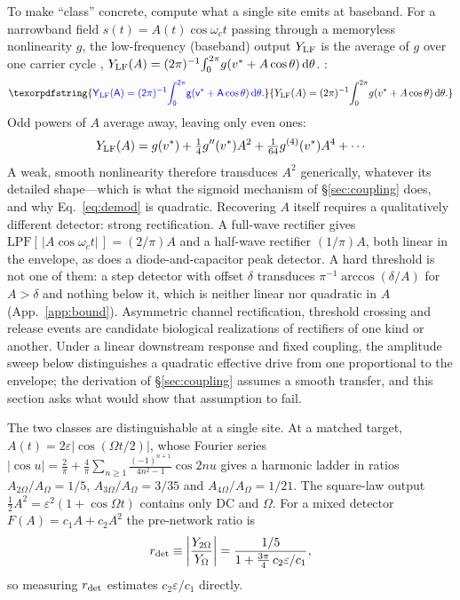 \documentclass[11pt,a4paper]{article}
\newcommand{\half}{\tfrac{1}{2}}
\providecommand{\DIFaddtex}[1]{{\protect\color{blue} \sf #1}} %
\providecommand{\DIFdeltex}[1]{{\protect\color{red} \scriptsize #1}} %
\providecommand{\DIFaddbegin}{} %
\providecommand{\DIFaddend}{} %
\providecommand{\DIFdelbegin}{} %
\providecommand{\DIFdelend}{} %
\providecommand{\DIFadd}[1]{\texorpdfstring{\DIFaddtex{#1}}{#1}} %
\providecommand{\DIFdel}[1]{\texorpdfstring{\DIFdeltex{#1}}{}} %
\begin{document}
\DIFdelbegin \DIFdel{To make ``class'' concrete, compute what a single site emits at baseband. }\DIFdelend For a narrowband field $s(t)=A(t)\cos\omega_c t$ passing through a memoryless nonlinearity
$g$, the low-frequency (baseband) output $Y_{\rm LF}$ is the average of $g$ over one
carrier cycle\DIFdelbegin \DIFdel{,
$Y_{\rm LF}(A)=(2\pi)^{-1}\!\int_0^{2\pi}\!g(v^*+A\cos\theta)\,\mathrm{d}\theta$. }\DIFdelend \DIFaddbegin \DIFadd{:
}\[
\DIFadd{Y_{\rm LF}(A)=(2\pi)^{-1}\!\int_0^{2\pi}\!g(v^*+A\cos\theta)\,\mathrm{d}\theta.
}\]
\DIFaddend Odd powers of $A$ average away, leaving only even ones:
\begin{equation}
Y_{\rm LF}(A)=g(v^*)+\tfrac14 g''(v^*)A^2+\tfrac1{64}g^{(4)}(v^*)A^4+\cdots
\label{eq:cycavg}
\end{equation}
A weak, smooth nonlinearity therefore transduces $A^2$ generically, whatever its detailed
shape---which is what the sigmoid mechanism of \S\ref{sec:coupling} does, and why
Eq.~\eqref{eq:demod} is quadratic. Recovering $A$ itself requires a qualitatively
different detector: strong rectification. A full-wave rectifier gives
$\mathrm{LPF}[\,|A\cos\omega_c t|\,]=(2/\pi)A$ and a half-wave rectifier
$(1/\pi)A$, both linear in the envelope, as does a diode-and-capacitor peak detector.
A hard threshold is not one of them: a step detector with offset $\delta$ transduces
$\pi^{-1}\arccos(\delta/A)$ for $A>\delta$ and nothing below it, which is neither linear
nor quadratic in $A$ (App.~\ref{app:bound}). Asymmetric channel rectification, threshold
crossing and release events are candidate biological realizations of rectifiers of one
kind or another. Under a linear downstream response and fixed coupling, the amplitude
sweep below distinguishes a quadratic effective drive from one proportional to the
envelope; the derivation of \S\ref{sec:coupling} assumes a smooth transfer, and this
section asks what would show that assumption to fail.

The two classes are distinguishable at a single site. At a matched target,
$A(t)=2\varepsilon|\cos(\Omega t/2)|$, whose Fourier series
$|\cos u|=\tfrac2\pi+\tfrac4\pi\sum_{n\ge1}\tfrac{(-1)^{n+1}}{4n^2-1}\cos 2nu$ gives a
harmonic ladder in ratios $A_{2\Omega}/A_\Omega=1/5$, $A_{3\Omega}/A_\Omega=3/35$ and
$A_{4\Omega}/A_\Omega=1/21$. The square-law output $\half A^2=\varepsilon^2(1+\cos\Omega
t)$ contains only DC and $\Omega$. For a mixed detector $F(A)=c_1A+c_2A^2$ the
pre-network ratio is
\begin{equation}
r_{\rm det}\equiv\left|\frac{Y_{2\Omega}}{Y_\Omega}\right|
=\frac{1/5}{1+\tfrac{3\pi}{4}\,c_2\varepsilon/c_1},
\label{eq:rdet}
\end{equation}
so measuring $r_{\rm det}$ estimates $c_2\varepsilon/c_1$ directly.
\end{document}
